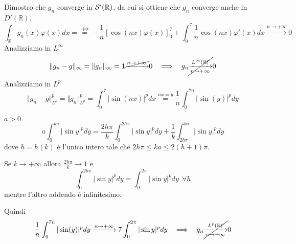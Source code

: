 Dimostro che $g_{n}$ converge in $\mathcal{S}  '(\mathbb{R})$, da cui si ottiene che $g_{n}$ converge anche in $D'(\mathbb{R})$.
\begin{equation*}
\int _{\mathbb{R}} g_{n}( x) \varphi ( x) dx=\overset{\text{ipp}}{=} -\frac{1}{n}[\cos( nx) \varphi ( x)]^{7}_{0} +\int ^{7}_{0}\frac{1}{n}\cos( nx) \varphi '( x) dx\xrightarrow{n\rightarrow +\infty } 0
\end{equation*}
Analizziamo in $L^{\infty }$
\begin{equation*}
\Vert g_{n} -g\Vert _{\infty } =\Vert g_{n}\Vert _{\infty } =1\cancel{\xrightarrow{n\rightarrow +\infty }} 0\ \ \implies \ \ g_{n}\cancel{\xrightarrow[n\rightarrow +\infty ]{L^{\infty }(\mathbb{R})}} 0
\end{equation*}
Analizziamo in $L^{p}$
\begin{equation*}
\Vert g_{n} -g\Vert ^{p}_{L^{p}} =\Vert g_{n}\Vert ^{p}_{L^{p}} =\int ^{7}_{0}| \sin( nx)| ^{p} dx\overset{nx=y}{=}\frac{1}{n}\int ^{7n}_{0}| \sin( y)| ^{p} dy
\end{equation*}
\begin{rem}
$a >0$
\begin{equation*}
a\int ^{ka}_{0}| \sin y| ^{p} dy=\frac{2h\pi }{k}\int ^{2h\pi }_{0}| \sin y| ^{p} dy+\frac{1}{k}\int ^{ka}_{2h\pi }| \sin y| ^{p} dy
\end{equation*}
dove $h=h( k)$ è l'unico intero tale che $2h\pi \leqslant ka\leqslant 2( h+1) \pi $.

Se $k\rightarrow +\infty $ allora $\frac{2h\pi }{k}\rightarrow 1$ e
\begin{equation*}
\int ^{2h\pi }_{0}| \sin y| ^{p} dy=\int ^{2\pi }_{0}| \sin y| ^{p} dy\ \ \forall h
\end{equation*}
mentre l'altro addendo è infinitesimo.
\end{rem}
Quindi
\begin{equation*}
\frac{1}{n}\int ^{7n}_{0}| \sin( y)| ^{p} dy\xrightarrow{n\rightarrow +\infty } 7\int ^{2\pi }_{0}| \sin y| ^{p} dy\ \ \implies \ \ g_{n}\cancel{\xrightarrow[n\rightarrow +\infty ]{L^{p}(\mathbb{R})}} 0
\end{equation*}
\Soluzione
